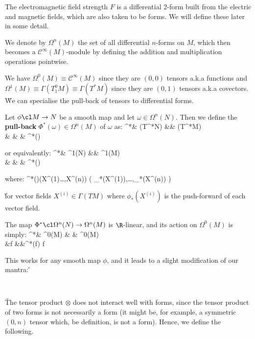 \be
The electromagnetic field strength $F$ is a differential $2$-form built from the electric and magnetic fields, which
are also taken to be forms. We will define these later in some detail.
\ee

\bd [$\Omega^n(M)$]
We denote by $\Omega^n(M)$ the set of all differential $n$-forms on $M$, which then becomes a $\mathcal{C}^\infty(M)
$-module by defining the addition and multiplication operations pointwise.
\ed

We have $\Omega^0(M)\equiv \mathcal{C}^\infty(M)$ since they are $(0,0)$ tensors a.k.a functions and $\Omega^1(M)
\equiv \Gamma(T^0_1 M)\equiv\Gamma(T^*M)$ since they are $(0,1)$ tensors a.k.a covectors. \v

We can specialise the pull-back of tensors to differential forms.

Let $\phi\cl M \to N$ be a smooth map and let $\omega\in \Omega^n(N)$. Then we define the \textbf{pull-back} $\Phi^*
(\omega)\in \Omega^n(M)$ of $\omega$ as:
\Phi^*\cl & \Gamma(T^*N) &\to & \Gamma(T^*M)\\ & \omega & \mapsto & \Phi^*(\omega)
\ei

or equivalently:
\Phi^*\cl & \Omega^1(N) &\to & \Omega^1(M)\\ & \omega & \mapsto & \Phi^*(\omega)
\ei

where:
\bse
\Phi^*(\omega)(X^{(1)}\ldots,X^{(n)}) \coloneqq \omega \bigl( \phi_*(X^{(1)}),\ldots,\phi_*(X^{(n)}) \bigr)
\ese

\v

for vector fields $X^{(i)} \in \Gamma(TM)$ where $\phi_*(X^{(i)})$ is the push-forward of each vector field.
\ed

The map $\Phi^*\cl\Omega^n(N)\to\Omega^n(M)$ is $\R$-linear, and its action on $\Omega^0(M)$ is simply:
\Phi^*\cl & \Omega^0(M) & \to & \Omega^0(M)\\ &f &\mapsto &\Phi^*(f) \coloneqq f\circ \phi
\ei

This works for any smooth map $\phi$, and it leads to a slight modification of our mantra: \v

\begin{center}
\\ 
\end{center}

\v

The tensor product $\otimes$ does not interact well with forms, since the tensor product of two forms is not
necessarily a form (it might be, for example, a symmetric $(0,n)$ tensor which, be definition, is not a form). Hence,
we define the following.

